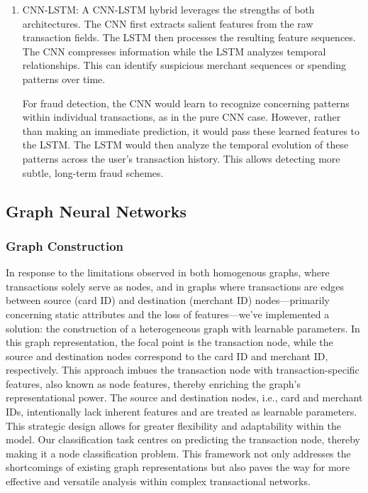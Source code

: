 \documentclass[pdflatex,sn-mathphys-num]{sn-jnl}%
\begin{document}
\begin{enumerate}[label=(\roman*),itemsep=10pt]
\item CNN-LSTM: A CNN-LSTM hybrid leverages the strengths of both architectures. The CNN first extracts salient features from the raw transaction fields. The LSTM then processes the resulting feature sequences. The CNN compresses information while the LSTM analyzes temporal relationships. This can identify suspicious merchant sequences or spending patterns over time.

For fraud detection, the CNN would learn to recognize concerning patterns within individual transactions, as in the pure CNN case. However, rather than making an immediate prediction, it would pass these learned features to the LSTM. The LSTM would then analyze the temporal evolution of these patterns across the user's transaction history. This allows detecting more subtle, long-term fraud schemes.

\end{enumerate}

\subsection{Graph Neural Networks}\label{subsec3}

\subsubsection{Graph Construction}\label{subsubsec3}

In response to the limitations observed in both homogenous graphs, where transactions solely serve as nodes, and in graphs where transactions are edges between source (card ID) and destination (merchant ID) nodes—primarily concerning static attributes and the loss of features—we've implemented a solution: the construction of a heterogeneous graph with learnable parameters. In this graph representation, the focal point is the transaction node, while the source and destination nodes correspond to the card ID and merchant ID, respectively. This approach imbues the transaction node with transaction-specific features, also known as node features, thereby enriching the graph's representational power. The source and destination nodes, i.e., card and merchant IDs, intentionally lack inherent features and are treated as learnable parameters. This strategic design allows for greater flexibility and adaptability within the model. Our classification task centres on predicting the transaction node, thereby making it a node classification problem. This framework not only addresses the shortcomings of existing graph representations but also paves the way for more effective and versatile analysis within complex transactional networks.
\end{document}
